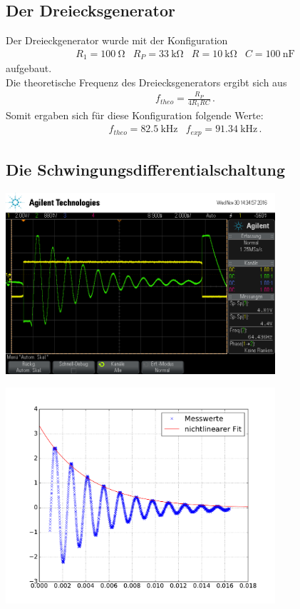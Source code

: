 \documentclass[]{scrartcl}
\begin{document}
\subsection{Der Dreiecksgenerator}
Der Dreieckgenerator wurde mit der Konfiguration
\begin{align*}
R_1=\SI{100}{\ohm} & R_P=\SI{33}{\kilo\ohm} & R=\SI{10}{\kilo\ohm} & C=\SI{100}{\nano\farad}
\end{align*}
aufgebaut. \\
Die theoretische Frequenz des Dreiecksgenerators ergibt sich aus
\begin{align}
f_{theo}=\frac{R_P}{4R_1RC}\,.
\end{align}
Somit ergaben sich für diese Konfiguration folgende Werte:
\begin{align}
f_{theo}=\SI{82.5}{\kilo\hertz} & f_{exp}=\SI{91.34}{\kilo\hertz}\,.
\end{align}

\subsection{Die Schwingungsdifferentialschaltung}

\begin{center}
	\includegraphics[width=10cm]{images/schwinggen.png}
	\label{fig:thermoexpon}
\end{center}

\begin{center}
	\includegraphics[width=10cm]{images/schwing_abfall.pdf}
	\label{fig:expfit}
\end{center}
\end{document}
